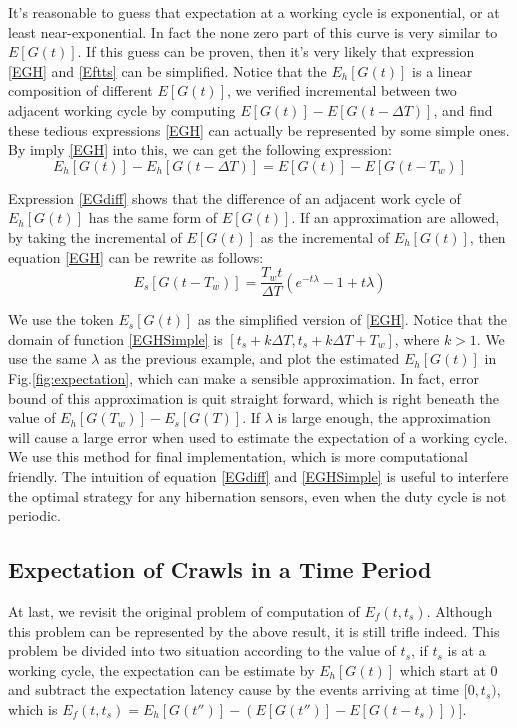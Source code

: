\documentclass[conference]{IEEEtran}
\begin{document}
It's reasonable to guess that expectation at a working cycle is exponential, or at least near-exponential. In fact the none zero part of this curve is very similar to $E[G(t)]$.
If this guess can be proven, then it's very likely that expression \eqref{EGH} and \eqref{Eftts} can be simplified. Notice that the \(E_h[G(t)]\) is a linear composition of different \(E[G(t)]\), we verified incremental between two adjacent working cycle by computing  $E[G(t)]-E[G(t-\Delta T)] $, and find these tedious expressions \eqref{EGH} can actually be represented by some simple ones. By imply \eqref{EGH} into this, we can get the following expression:
\begin{equation}
E_h[G(t)]-E_h[G(t-\Delta T)]=E[G(t)]-E[G(t-T_w)]\label{EGdiff}
\end{equation}


Expression \eqref{EGdiff} shows that the difference of an adjacent work cycle of $E_h[G(t)]$ has the same form of $E[G(t)]$. If an approximation are allowed, by taking the incremental of $E[G(t)]$ as the incremental of $E_h[G(t)]$, then equation \eqref{EGH} can be rewrite as follows:
\begin{equation}
E_s[G(t-T_w)]=\frac{T_w t}{\Delta T}(e^{-t\lambda}-1+t\lambda)\label{EGHSimple}
\end{equation}


We use the token $E_s[G(t)]$ as the simplified version of \eqref{EGH}. Notice that the domain of function \eqref{EGHSimple} is $[t_s+k\Delta T, t_s+k\Delta T+T_w]$, where $k>1$. 
We use the same $\lambda$ as the previous example, and plot the estimated $E_h[G(t)]$ in Fig.\ref{fig:expectation}, which can make a sensible approximation. In fact, error bound of this approximation is quit straight forward, which is right beneath the value of $E_h[G(T_w)]-E_s[G(T)]$. If $\lambda$ is large enough, the approximation will cause a large error when used to estimate the expectation of a working cycle.
We use this method for final implementation, which is more computational friendly. 
The intuition of equation \eqref{EGdiff}  and \eqref{EGHSimple} is useful to interfere the optimal strategy for any hibernation sensors, even when the duty cycle is not periodic.

\subsection{Expectation of Crawls in a Time Period}

At last, we revisit the original problem of computation of $E_f(t,t_s)$. Although this problem can be represented by the above result, it is still trifle indeed. 
This problem be divided into two situation according to the value of $t_s$, if $t_s$ is at a working cycle, the expectation can be estimate by $E_h[G(t)]$ which start at $0$ and subtract the expectation latency cause by the events arriving at time $[0, t_s)$, which is $E_f(t,t_s)=E_h[G(t'')]-(E[G(t'')]-E[G(t-t_s)])]$. 
\end{document}
